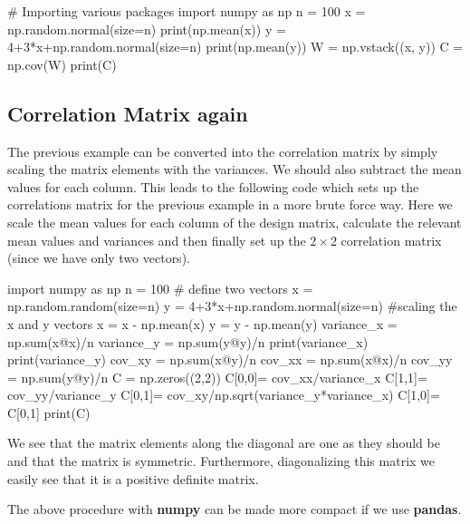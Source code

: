\documentclass[%
oneside,                 %
final,                   %
10pt]{article}
\begin{document}
\bpycod
# Importing various packages
import numpy as np
n = 100
x = np.random.normal(size=n)
print(np.mean(x))
y = 4+3*x+np.random.normal(size=n)
print(np.mean(y))
W = np.vstack((x, y))
C = np.cov(W)
print(C)

\epycod


\subsection{Correlation Matrix again}

The previous example can be converted into the correlation matrix by
simply scaling the matrix elements with the variances.  We should also
subtract the mean values for each column. This leads to the following
code which sets up the correlations matrix for the previous example in
a more brute force way. Here we scale the mean values for each column of the design matrix, calculate the relevant mean values and variances and then finally set up the $2\times 2$ correlation matrix (since we have only two vectors). 























\bpycod
import numpy as np
n = 100
# define two vectors                                                                                           
x = np.random.random(size=n)
y = 4+3*x+np.random.normal(size=n)
#scaling the x and y vectors                                                                                   
x = x - np.mean(x)
y = y - np.mean(y)
variance_x = np.sum(x@x)/n
variance_y = np.sum(y@y)/n
print(variance_x)
print(variance_y)
cov_xy = np.sum(x@y)/n
cov_xx = np.sum(x@x)/n
cov_yy = np.sum(y@y)/n
C = np.zeros((2,2))
C[0,0]= cov_xx/variance_x
C[1,1]= cov_yy/variance_y
C[0,1]= cov_xy/np.sqrt(variance_y*variance_x)
C[1,0]= C[0,1]
print(C)

\epycod


We see that the matrix elements along the diagonal are one as they
should be and that the matrix is symmetric. Furthermore, diagonalizing
this matrix we easily see that it is a positive definite matrix.

The above procedure with \textbf{numpy} can be made more compact if we use \textbf{pandas}.
\end{document}
